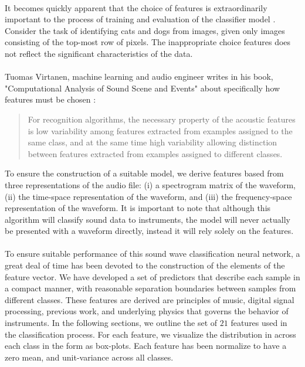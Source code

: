 \documentclass[12pt,letterpaper]{article}
\begin{document}
\paragraph*{}It becomes quickly apparent that the choice of features is extraordinarily important to the process of training and evaluation of the classifier model \cite{Mierswa}. Consider the task of identifying cats and dogs from images, given only images consisting of the top-most row of pixels. The inappropriate choice features does not reflect the significant characteristics of the data.

\paragraph*{}Tuomas Virtanen, machine learning and audio engineer writes in his book, "Computational Analysis of Sound Scene and Events" about specifically how features must be chosen \cite{Virtanen}:
\begin{quote}
For recognition algorithms, the necessary property of the acoustic features is low variability among features extracted from examples assigned to the same class, and at the same time high variability allowing distinction between features extracted from examples assigned to different classes.
\end{quote}
To ensure the construction of a suitable model, we derive features based from three representations of the audio file: (i) a spectrogram matrix of the waveform, (ii) the time-space representation of the waveform, and (iii) the frequency-space representation of the waveform. It is important to note that although this algorithm will classify sound data to instruments, the model will never actually be presented with a waveform directly, instead it will rely solely on the features.

\paragraph*{}To ensure suitable performance of this sound wave classification neural network, a great deal of time has been devoted to the construction of the elements of the feature vector. We have developed a set of predictors that describe each sample in a compact manner, with reasonable separation boundaries between samples from different classes.
These features are derived are principles of music, digital signal processing, previous work, and underlying physics that governs the behavior of instruments. In the following sections, we outline the set of $21$ features used in the classification process. For each feature, we visualize the distribution in across each class in the form as box-plots. Each feature has been normalize to have a zero mean, and unit-variance across all classes. 
\end{document}
